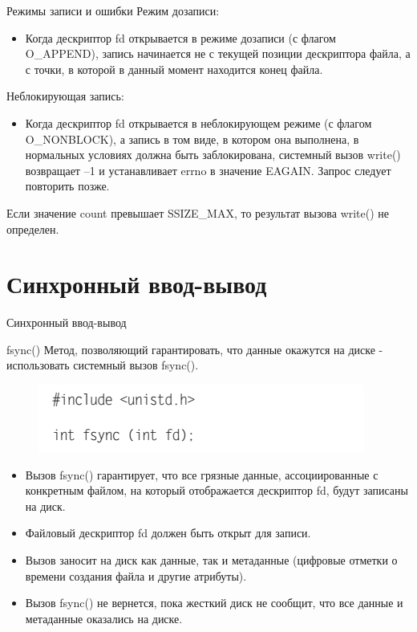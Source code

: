 \documentclass{beamer}
\begin{document}
\begin{frame}{Режимы записи и ошибки}
Режим дозаписи: 
\begin{itemize}
\item Когда дескриптор fd открывается в режиме дозаписи (с флагом O\_APPEND), запись начинается не с текущей позиции дескриптора файла, а с точки, в которой в данный момент находится конец файла.
\end{itemize}
Неблокирующая запись: 
\begin{itemize}
\item Когда дескриптор fd открывается в неблокирующем режиме (с флагом O\_NONBLOCK),
а запись в том виде, в котором она выполнена, в нормальных условиях должна быть
заблокирована, системный вызов write() возвращает –1 и устанавливает errno в значение EAGAIN. Запрос следует повторить позже.
\end{itemize}
Если значение count превышает SSIZE\_MAX, то результат вызова write() не определен.
\end{frame}

\section{Синхронный ввод-вывод}
\begin{frame}{Синхронный ввод-вывод}
\begin{block}{fsync()}
Метод, позволяющий гарантировать, что данные окажутся на диске -  использовать системный вызов fsync().
\begin{figure}[h]
\centering
\includegraphics[scale=0.6]{images/lec06-pic14.png}
\end{figure}
\end{block}
\begin{itemize}
\item Вызов fsync() гарантирует, что все грязные данные, ассоциированные с конкретным файлом, на который отображается дескриптор fd, будут записаны на диск.
\item Файловый дескриптор fd должен быть открыт для записи. 
\item Вызов заносит на диск как данные, так и метаданные (цифровые отметки о времени создания файла и другие атрибуты).
\item Вызов fsync() не вернется, пока жесткий диск не сообщит, что все данные и метаданные оказались на диске.
\end{itemize}
\end{frame}
\end{document}
